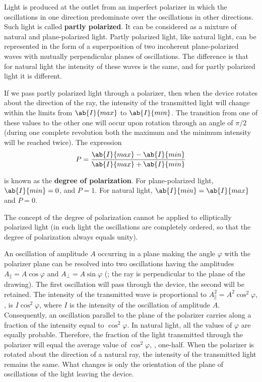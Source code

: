 Light is produced at the outlet from an imperfect polarizer in which the oscillations in one direction predominate over the oscillations in other directions.
Such light is called \textbf{partly polarized}.
It can be considered as a mixture of natural and plane-polarized light.
Partly polarized light, like natural light, can be represented in the form of a superposition of two incoherent plane-polarized waves with mutually perpendicular planes of oscillations.
The difference is that for natural light the intensity of these waves is the same, and for partly polarized light it is different.

If we pass partly polarized light through a polarizer, then when the device rotates about the direction of the ray, the intensity of the transmitted light will change within the limits from $\ab{I}{max}$ to $\ab{I}{min}$.
The transition from one of these values to the other one will occur upon rotation through an angle of $\pi/2$ (during one complete revolution both the maximum and the minimum intensity will be
reached twice).
The expression
\begin{equation}\label{eq:19_3}
	P = \frac{\ab{I}{max} - \ab{I}{min}}{\ab{I}{max} + \ab{I}{min}}
\end{equation}

\noindent
is known as the \textbf{degree of polarization}.
For plane-polarized light, $\ab{I}{min}=0$, and $P=1$.
For natural light, $\ab{I}{min}=\ab{I}{max}$ and $P=0$.

The concept of the degree of polarization cannot be applied to elliptically polarized light (in such light the oscillations are completely ordered, so that the degree of polarization always equals unity).

An oscillation of amplitude $A$ occurring in a plane making the angle $\varphi$ with the polarizer plane can be resolved into two oscillations having the amplitudes $A_{\parallel} =A\cos\varphi$ and $A_{\perp}=A\sin\varphi$ (; the ray is perpendicular to the plane of the drawing).
The first oscillation will pass through the device, the second will be retained.
The intensity of the transmitted wave is proportional to $A_{\parallel}^2= A^2 \cos^2\varphi$, \ie, is $I\cos^2\varphi$, where $I$ is the intensity of the oscillation of amplitude $A$.
Consequently, an oscillation parallel to the plane of the polarizer carries along a fraction of the intensity equal to $\cos^2\varphi$.
In natural light, all the values of $\varphi$ are equally probable.
Therefore, the fraction of the light transmitted through the polarizer will equal the average value of $\cos^2\varphi$, \ie, one-half.
When the polarizer is rotated about the direction of a natural ray, the intensity of the transmitted light remains the same.
What changes is only the orientation of the plane of oscillations of the light leaving the
device.

